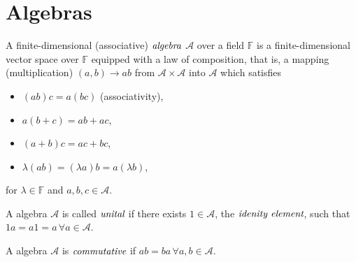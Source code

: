\section{Algebras} %
\label{sec:algebras}

\begin{defn}[Algebras]
	A finite-dimensional (associative) $\emph{algebra}$ $\mathcal{A}$
	over a field $\mathbb{F}$ is a finite-dimensional vector space over
	$\mathbb{F}$ equipped with a law of composition, that is, a mapping
	(multiplication) $(a,b) \to ab$ from $\mathcal{A} \times \mathcal{A}$
	into $\mathcal{A}$ which satisfies
	\begin{itemize}
		\item $(ab)c=a(bc)$ (associativity),
		\item $a(b + c) = ab + ac$,
		\item $(a + b)c = ac + bc$,
		\item $\lambda (ab) = (\lambda a)b = a(\lambda b)$,
	\end{itemize}
	for $\lambda \in \mathbb{F}$ and $a,b,c \in \mathcal{A}$.
\end{defn}

\begin{rem}
	A algebra $\mathcal{A}$ is called $\emph{unital}$ if there exists
	$1 \in \mathcal{A}$, the $\emph{idenity element}$, such that
	$1a=a1=a \, \forall a \in \mathcal{A}$.
\end{rem}

\begin{rem}
	A algebra $\mathcal{A}$ is $\emph{commutative}$ if
	$ab=ba \, \forall a,b \in \mathcal{A}$.
\end{rem}
